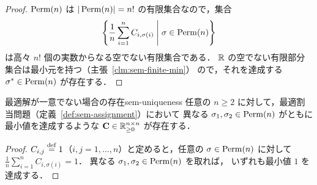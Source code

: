 \begin{proof}
  $\operatorname{Perm}(n)$ は $|\operatorname{Perm}(n)| = n!$ の有限集合なので，集合
  \[
    \left\{ \frac{1}{n}\sum_{i=1}^{n} C_{i, \sigma(i)} \;\middle|\; \sigma \in \operatorname{Perm}(n) \right\}
  \]
  は高々 $n!$ 個の実数からなる空でない有限集合である．
  $\mathbb{R}$ の空でない有限部分集合は最小元を持つ（主張~\ref{clm:sem-finite-min}）
  ので，それを達成する $\sigma^* \in \operatorname{Perm}(n)$ が存在する．
\end{proof}

\begin{claim}{最適解が一意でない場合の存在}{sem-uniqueness}
  任意の $n \geq 2$ に対して，最適割当問題（定義~\ref{def:sem-assignment}）において
  異なる $\sigma_1, \sigma_2 \in \operatorname{Perm}(n)$ がともに最小値を達成するような
  $\mathbf{C} \in \mathbb{R}_{\geq 0}^{n \times n}$ が存在する．
\end{claim}

\begin{proof}
  $C_{i,j} \overset{\mathrm{def}}{=} 1$（$i, j = 1, \ldots, n$）と定めると，任意の $\sigma \in \operatorname{Perm}(n)$ に対して
  $\frac{1}{n}\sum_{i=1}^{n} C_{i, \sigma(i)} = 1$．
  異なる $\sigma_1, \sigma_2 \in \operatorname{Perm}(n)$ を取れば，
  いずれも最小値 $1$ を達成する．
\end{proof}
